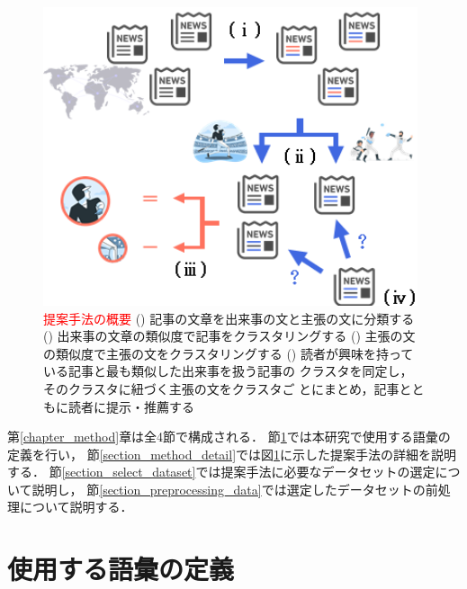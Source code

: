\documentclass[12pt,a4j]{jreport}
\begin{document}
\begin{figure}[H]
	\centering
	\includegraphics[keepaspectratio, width=110mm]{img/method_abstract.png}
	\caption{
    \textcolor{red}{提案手法の概要}
    \newline
    \qquad\quad()
    記事の文章を出来事の文と主張の文に分類する
    \newline
    \qquad\quad()
    出来事の文章の類似度で記事をクラスタリングする
    \newline
    \qquad\quad()
    主張の文の類似度で主張の文をクラスタリングする
    \newline
    \qquad\quad()
    読者が興味を持っている記事と最も類似した出来事を扱う記事の
    \newline
    \qquad\qquad\quad
    クラスタを同定し，そのクラスタに紐づく主張の文をクラスタご
    \newline
    \qquad\qquad\quad
    とにまとめ，記事とともに読者に提示・推薦する
  }
	\label{fig_method_abstract}
\end{figure}

第\ref{chapter_method}章は全4節で構成される．
節\ref{section_term_definition}では本研究で使用する語彙の定義を行い，
節\ref{section_method_detail}では図\ref{fig_method_abstract}に示した提案手法の詳細を説明する．
節\ref{section_select_dataset}では提案手法に必要なデータセットの選定について説明し，
節\ref{section_preprocessing_data}では選定したデータセットの前処理について説明する．

\section{使用する語彙の定義}
\label{section_term_definition}
\end{document}
